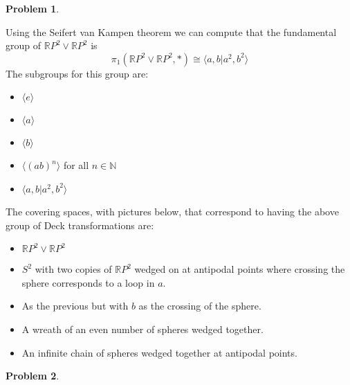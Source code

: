 \documentclass[10pt]{article}
\newcommand{\sk}{\vskip 10mm}
\newcommand{\bb}[1]{\mathbb{#1}}
\theoremstyle{plain}
\newtheorem{problem}{Problem}
\theoremstyle{remark}
\begin{document}
\sk

\begin{problem} %
  
\end{problem}

Using the Seifert van Kampen theorem we can compute that the
fundamental group of $\bb{R}P^2\vee \bb{R}P^2$ is
\[ \pi_1(\bb{R}P^2\vee \bb{R}P^2,*)\cong \langle a,b|a^2,b^2\rangle\]
The subgroups for this group are:
\begin{itemize}
\item $\langle e\rangle$
\item $\langle a\rangle$
\item $\langle b\rangle$
\item $\langle (ab)^n\rangle$ for all $n\in \bb{N}$
\item $\langle a,b|a^2,b^2\rangle$
\end{itemize}

The covering spaces, with pictures below, that correspond to having
the above group of Deck transformations are:

\begin{itemize}
\item $\bb{R}P^2\vee \bb{R}P^2$
\item $S^2$ with two copies of $\bb{R}P^2$ wedged on at antipodal points where
  crossing the sphere corresponds to a loop in $a$.
\item As the previous but with $b$ as the crossing of the sphere.
\item A wreath of an even number of spheres wedged together.
\item An infinite chain of spheres wedged together at antipodal points.
\end{itemize}


\sk

\begin{problem} %
  
\end{problem}
\end{document}
